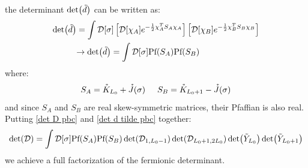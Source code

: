 the determinant $\det(\Tilde{d})$ can be written as:
\begin{equation}\label{det d tilde pbc}
\begin{split}
\det (\Tilde{d}) = \int \mathcal{D}[\sigma] \left[\mathcal{D}[\chi_A] e^{-\frac{1}{2}\chi_A^T S_A \chi_A} \right] \left[\mathcal{D}[\chi_B] e^{-\frac{1}{2}\chi_B^T S_B \chi_B} \right] \\
        \rightarrow \det(\Tilde{d}) = \int \mathcal{D}[\sigma] \textrm{Pf}(S_A)\textrm{Pf}(S_B) \hspace{25mm}
\end{split}
\end{equation}
where:
\begin{equation}\label{final SA SB}
    S_A = \accentset{\ast}{K}_{L_0} + \accentset{\ast}{J}(\sigma) \hspace{5 mm} S_B = \accentset{\ast}{K}_{L_0 + 1} - \accentset{\ast}{J}(\sigma)
\end{equation}
and since $S_A$ and $S_B$ are real skew-symmetric matrices, their Pfaffian is also real.
\\ Putting \eqref{det D pbc} and \eqref{det d tilde pbc} together:
\begin{equation}
    \det(\mathcal{D}) = \int \mathcal{D}[\sigma] \textrm{Pf}(S_A)\textrm{Pf}(S_B) \det(\mathcal{D}_{1, L_0 - 1}) \det(\mathcal{D}_{L_0 + 1, 2L_0}) \det(\Tilde{Y}_{L_0})  \det(\Tilde{Y}_{L_0 + 1})
\end{equation}
we achieve a full factorization of the fermionic determinant.

